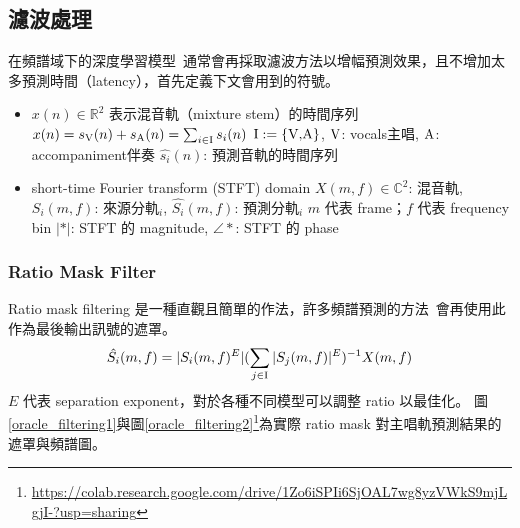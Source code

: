 \subsection{濾波處理}
在頻譜域下的深度學習模型~\cite{hennequin2020spleeter,stoter20182018}通常會再採取濾波方法以增幅預測效果，且不增加太多預測時間（latency），首先定義下文會用到的符號。
\begin{itemize}
    \item $x(n)\in\mathbb{R}^2$ 表示混音軌（mixture stem）的時間序列
    \subitem $x(n)=s_{\textup{V}}{(n)} + s_{\textup{A}}{(n)} = \sum_{i\in\textup{I}}{s_i{(n)}}$
    \subitem $\textup{I} := \{\textup{V,A}\}$, $\textup{V}$: vocals主唱, $\textup{A}$: accompaniment伴奏
    \subitem $\hat{s_i}{(n)}$: 預測音軌的時間序列
    \item short-time Fourier transform (STFT) domain
    \subitem $X(m,f)\in\mathbb{C}^2$: 混音軌, $S_i(m,f)$: 來源分軌$_i$, $\hat{S_i}{(m,f)}$: 預測分軌$_i$
    \subitem $m$ 代表 frame；$f$ 代表 frequency bin
    \subitem $\vert\ast\vert$: STFT 的 magnitude, $\angle \ast$: STFT 的 phase
\end{itemize}

\subsubsection{Ratio Mask Filter}
Ratio mask filtering 是一種直觀且簡單的作法，許多頻譜預測的方法~\cite{bao_abdulla_2018,stoter20182018}會再使用此作為最後輸出訊號的遮罩。
\begin{equation*}
    \hat{S_i}{(m,f)} = \vert S_i(m,f)^E\vert (\sum_{j\in\textup{I}}\vert S_j(m,f)\vert^E)^{-1}X(m,f)
\end{equation*}
$E$ 代表 separation exponent，對於各種不同模型可以調整 ratio 以最佳化。
圖\ref{oracle_filtering1}與圖\ref{oracle_filtering2}\footnote{\url{https://colab.research.google.com/drive/1Zo6iSPIi6SjOAL7wg8yzVWkS9mjLgjI-?usp=sharing}}為實際 ratio mask 對主唱軌預測結果的遮罩與頻譜圖。

